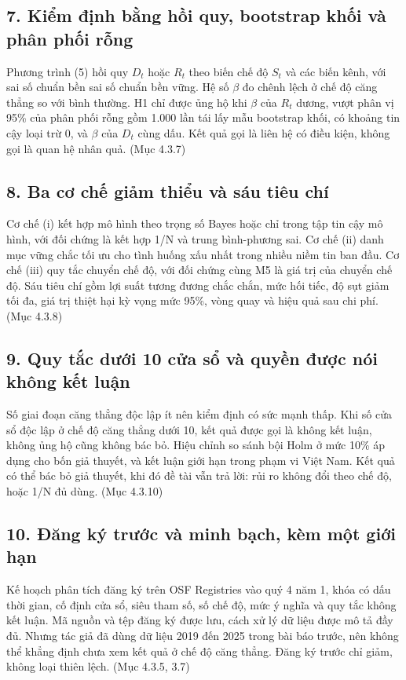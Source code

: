 \subsection{7. Kiểm định bằng hồi quy, bootstrap khối và phân phối rỗng}

Phương trình (5) hồi quy \(D_{t}\) hoặc \(R_{t}\) theo biến chế độ \(S_{t}\) và các biến kênh, với sai số chuẩn bền sai số chuẩn bền vững. Hệ số \(\beta\) đo chênh lệch ở chế độ căng thẳng so với bình thường. H1 chỉ được ủng hộ khi \(\beta\) của \(R_{t}\) dương, vượt phân vị 95\% của phân phối rỗng gồm 1.000 lần tái lấy mẫu bootstrap khối, có khoảng tin cậy loại trừ 0, và \(\beta\) của \(D_{t}\) cùng dấu. Kết quả gọi là liên hệ có điều kiện, không gọi là quan hệ nhân quả. (Mục 4.3.7)

\subsection{8. Ba cơ chế giảm thiểu và sáu tiêu chí}

Cơ chế (i) kết hợp mô hình theo trọng số Bayes hoặc chỉ trong tập tin cậy mô hình, với đối chứng là kết hợp 1/N và trung bình-phương sai. Cơ chế (ii) danh mục vững chắc tối ưu cho tình huống xấu nhất trong nhiều niềm tin ban đầu. Cơ chế (iii) quy tắc chuyển chế độ, với đối chứng cùng M5 là giá trị của chuyển chế độ. Sáu tiêu chí gồm lợi suất tương đương chắc chắn, mức hối tiếc, độ sụt giảm tối đa, giá trị thiệt hại kỳ vọng mức 95\%, vòng quay và hiệu quả sau chi phí. (Mục 4.3.8)

\subsection{9. Quy tắc dưới 10 cửa sổ và quyền được nói không kết luận}

Số giai đoạn căng thẳng độc lập ít nên kiểm định có sức mạnh thấp. Khi số cửa sổ độc lập ở chế độ căng thẳng dưới 10, kết quả được gọi là không kết luận, không ủng hộ cũng không bác bỏ. Hiệu chỉnh so sánh bội Holm ở mức 10\% áp dụng cho bốn giả thuyết, và kết luận giới hạn trong phạm vi Việt Nam. Kết quả có thể bác bỏ giả thuyết, khi đó đề tài vẫn trả lời: rủi ro không đổi theo chế độ, hoặc 1/N đủ dùng. (Mục 4.3.10)

\subsection{10. Đăng ký trước và minh bạch, kèm một giới hạn}

Kế hoạch phân tích đăng ký trên OSF Registries vào quý 4 năm 1, khóa có dấu thời gian, cố định cửa sổ, siêu tham số, số chế độ, mức ý nghĩa và quy tắc không kết luận. Mã nguồn và tệp đăng ký được lưu, cách xử lý dữ liệu được mô tả đầy đủ. Nhưng tác giả đã dùng dữ liệu 2019 đến 2025 trong bài báo trước, nên không thể khẳng định chưa xem kết quả ở chế độ căng thẳng. Đăng ký trước chỉ giảm, không loại thiên lệch. (Mục 4.3.5, 3.7)

